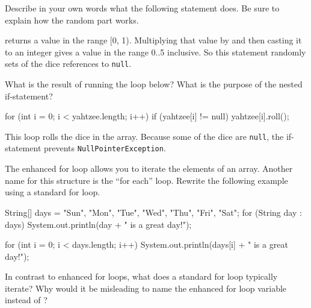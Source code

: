 \Q Describe in your own words what the following statement does. Be sure to explain how the random part works.

\begin{center}
\end{center}

\begin{answer}
 returns a value in the range [0, 1).
Multiplying that value by  and then casting it to an integer gives a value in the range 0..5 inclusive.
So this statement randomly sets of the dice references to {\tt null}.
\end{answer}


\Q \label{fordie} What is the result of running the loop below?
What is the purpose of the nested if-statement?

\begin{javalst}
for (int i = 0; i < yahtzee.length; i++) {
    if (yahtzee[i] != null) {
        yahtzee[i].roll();
    }
}
\end{javalst}
\vspace{-1ex}

\begin{answer}
This loop rolls the dice in the array.
Because some of the dice are {\tt null}, the if-statement prevents {\tt NullPointerException}.
\end{answer}


\Q The enhanced for loop allows you to iterate the elements of an array.
Another name for this structure is the ``for each'' loop.
Rewrite the following example using a standard for loop.

\vspace{1ex}
\begin{javalst}
String[] days = {"Sun", "Mon", "Tue", "Wed", "Thu", "Fri", "Sat"};
for (String day : days) {
    System.out.println(day + " is a great day!");
}
\end{javalst}
\vspace{-1em}

\begin{answer}[5em]
\begin{javaans}
for (int i = 0; i < days.length; i++) {
    System.out.println(days[i] + " is a great day!");
}
\end{javaans}
\end{answer}


\Q In contrast to enhanced for loops, what does a standard for loop typically iterate?
Why would it be misleading to name the enhanced for loop variable  instead of ?


